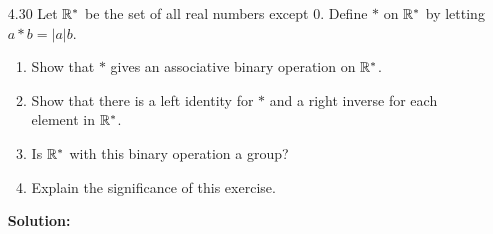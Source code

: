 \begin{enumerate}
      \textbf{Proof:} Suppose $|G| = 2k$, for some positive integer $k$. We 
      define a binary relation $\sim$ on $G$ such that for all $a, b \in G$,
      $a \sim b$ if and only if $a' = b$. We can show that $\sim$ is an 
      equivalence relation on $G$. Let $\mathcal{C}$ be the set of equivalence 
      classes of $\sim$. We observe that an equivalence class
      $C \in \mathcal{C}$ contains either 1 element or 2 elements. We can write
      $\mathcal{C}$ as a union of two disjoint sets, say
      $$\mathcal{C} = \mathcal{C}_1 \cup \mathcal{C}_2$$
      where $\mathcal{C}_i$ is the set of equivalence classes of $\sim$ that 
      contain $i$ elements. Thus
      $$|G| = |\mathcal{C}_1| + 2|\mathcal{C}_2| = 2k.$$
      Since $\{e\} \in \mathcal{C}_1$, it follows that $|\mathcal{C}_1| \ge 1$.
      To complete the proof it suffices to show that $|\mathcal{C}_1| \ge 2$.
      First we want to show that $|\mathcal{C}_2| \le k - 1$. So assume by
      contradiction that $|\mathcal{C}_2| \ge k$. Then since
      $|\mathcal{C}_1| \ge 1$, it must be the case that
      $2k = |\mathcal{C}_1| + 2|\mathcal{C}_2| \ge 1 + 2k$, a contradiction. So
      we must have that $|\mathcal{C}_2| \le k - 1$, so that
      $2k = |\mathcal{C}_1| + 2|\mathcal{C}_2| \le |\mathcal{C}_1| + 2k - 2$.
      That is, $2k \le |\mathcal{C}_1| + 2k - 2$. Solving this inequality gives
      us $|\mathcal{C}_1| \ge 2$. \qed
   \item[4.30] Let $\mathbb{R}^*$ be the set of all real numbers except 0. Define $*$ on
               $\mathbb{R}^*$ by letting $a * b = |a|b$.
               \begin{enumerate}
                  \item Show that $*$ gives an associative binary operation on
                        $\mathbb{R}^*$.
                  \item Show that there is a left identity for $*$ and a right
                        inverse for each element in $\mathbb{R}^*$.
                  \item Is $\mathbb{R}^*$ with this binary operation a group?
                  \item Explain the significance of this exercise.
               \end{enumerate}

      \textbf{Solution:}


\end{enumerate}
